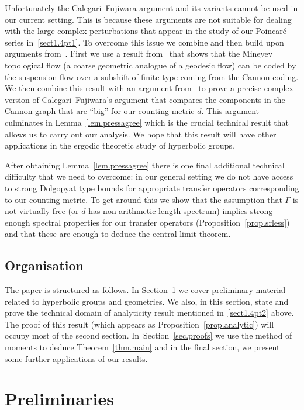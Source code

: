 \documentclass[AHL,Unicode,longabstracts,published]{cedram}
\newcommand{\G}{\Gamma}
\theoremstyle{plain}
\newcommand{\G}{\Gamma}
\begin{document}
Unfortunately the Calegari--Fujiwara argument and its variants cannot be used in our current setting. This is because these arguments are not suitable for dealing with the large complex perturbations that appear in the study of our Poincaré series in~\eqref{sect1.4pt1}. To overcome this issue we combine and then build upon arguments from~\cite{cantrell,cantrell.tanaka.2}. First we use a result from~\cite{cantrell.tanaka.2} that shows that the Mineyev topological flow (a coarse geometric analogue of a geodesic flow) can be coded by the suspension flow over a subshift of finite type coming from the Cannon coding. We then combine this result with an argument from~\cite{cantrell} to prove a precise complex version of Calegari--Fujiwara's argument that compares the components in the {Cannon graph} that are ``big'' for our counting metric $d$. This argument culminates in Lemma~\ref{lem.pressagree} which is the crucial technical result that allows us to carry out our analysis. We hope that this result will have other applications in the ergodic theoretic study of hyperbolic groups.


After obtaining Lemma~\ref{lem.pressagree} there is one final additional technical difficulty that we need to overcome: in our general setting we do not have access to strong Dolgopyat type bounds for appropriate transfer operators corresponding to our counting metric. To get around this we show that the assumption that $\G$ is not virtually free (or $d$ has non-arithmetic length spectrum) implies strong enough spectral properties for our transfer operators (Proposition~\ref{prop.srless}) and that these are enough to deduce the central limit theorem.

\subsection*{Organisation}

The paper is structured as follows. In Section~\ref{sect2} we cover preliminary material related to hyperbolic groups and geometries. We also, in this section, state and prove the technical domain of analyticity result mentioned in~\eqref{sect1.4pt2} above. The proof of this result (which appears as Proposition~\ref{prop.analytic}) will occupy most of the second section. In~Section~\ref{sec.proofs} we use the method of moments to deduce Theorem~\ref{thm.main} and in the final section, we present some further applications of our results.



\section{Preliminaries}\label{sect2}
\end{document}

